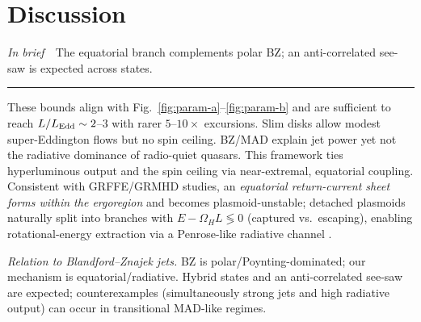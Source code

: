 \documentclass[twocolumn]{aastex701}
\newcommand{\LEdd}{L_{\rm Edd}}
\providecommand{\tldr}[1]{%
  \noindent\textit{In brief}\ \textemdash\ #1%
  \par\smallskip
  \noindent\rule{\columnwidth}{0.2pt}\par\medskip
}
\begin{document}
\clearpage
\section{Discussion}\label{sec:discussion}
\tldr{The equatorial branch complements polar BZ; an anti-correlated see-saw is expected across states.}
These bounds align with Fig.~\ref{fig:param-a}--\ref{fig:param-b} and are sufficient to reach $L/\LEdd\sim2$--$3$ with rarer $5$--$10\times$ excursions. Slim disks allow modest super-Eddington flows but no spin ceiling. BZ/MAD explain jet power yet not the radiative dominance of radio-quiet quasars. This framework ties hyperluminous output and the spin ceiling via near-extremal, equatorial coupling.
Consistent with GRFFE/GRMHD studies, an \emph{equatorial return-current sheet forms within the ergoregion} and becomes plasmoid-unstable; detached plasmoids naturally split into branches with $E-\Omega_H L\lessgtr 0$ (captured vs.\ escaping), enabling rotational-energy extraction via a Penrose-like radiative channel \citep{Penrose1969,Penrose2002,Komissarov2004MNRAS,EastYang2018PRD,Pan2018PRD,Parfrey2019PRL,Bransgrove2021PRL}.


\noindent\textit{Relation to Blandford--Znajek jets.}
BZ is polar/Poynting-dominated; our mechanism is equatorial/radiative. Hybrid states and an anti-correlated see-saw are expected; counterexamples (simultaneously strong jets and high radiative output) can occur in transitional MAD-like regimes.
\end{document}
